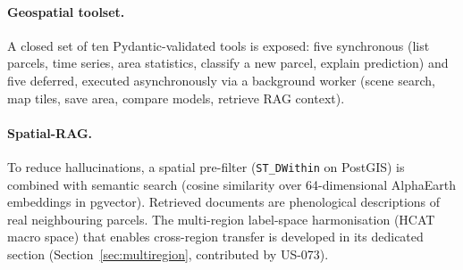 \paragraph{Geospatial toolset.}
A closed set of ten Pydantic-validated tools is exposed: five
synchronous (list parcels, time series, area statistics, classify a new
parcel, explain prediction) and five deferred, executed asynchronously
via a background worker (scene search, map tiles, save area, compare
models, retrieve RAG context).

\paragraph{Spatial-RAG.}
To reduce hallucinations, a spatial pre-filter (\texttt{ST\_DWithin} on
PostGIS) is combined with semantic search (cosine similarity over
64-dimensional AlphaEarth embeddings in pgvector). Retrieved documents
are phenological descriptions of real neighbouring parcels. The
multi-region label-space harmonisation (HCAT macro space) that enables
cross-region transfer is developed in its dedicated section
(Section~\ref{sec:multiregion}, contributed by US-073).
